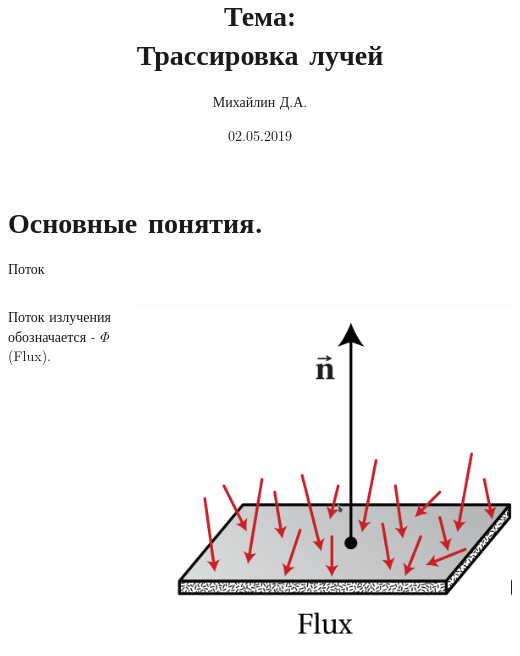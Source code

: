 \documentclass{beamer}
\title{Тема: \\ Трассировка лучей }
\subtitle{}
\author{Михайлин Д.А.}
\date{02.05.2019}
\begin{document}

\begin{frame}
	\maketitle 
\end{frame}


\section{Основные понятия.} %


\begin{frame}{Поток}
	\begin{columns}
			Поток излучения обозначается - $\Phi$(Flux). 
		
			\includegraphics[width=\linewidth]{Flux.png}
	\end{columns}
\end{frame}
\end{document}
